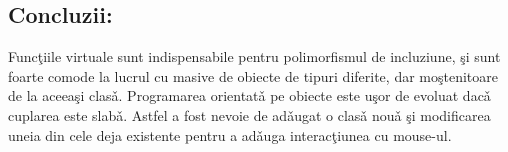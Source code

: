 \subsection{Concluzii:}
Func\c{t}iile virtuale sunt indispensabile pentru polimorfismul de incluziune, \c{s}i sunt foarte 
comode la lucrul cu masive de obiecte de tipuri diferite, dar mo\c{s}tenitoare de la aceea\c{s}i
clas\v{a}.
Programarea orientat\v{a} pe obiecte este u\c{s}or de evoluat dac\v{a} cuplarea este slab\v{a}. Astfel
a fost nevoie de ad\v{a}ugat o clas\v{a} nou\v{a} \c{s}i modificarea uneia din cele deja existente
pentru a ad\v{a}uga interac\c{t}iunea cu mouse-ul.
